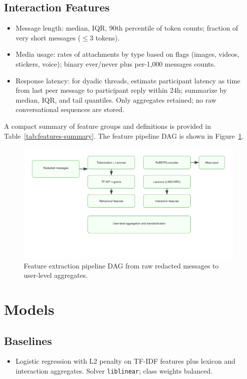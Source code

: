 \subsection{Interaction Features}
\begin{itemize}
  \item Message length: median, IQR, 90th percentile of token counts; fraction of very short messages (\(\leq 3\) tokens).
  \item Media usage: rates of attachments by type based on flags (images, videos, stickers, voice); binary ever/never plus per-1,000 messages counts.
  \item Response latency: for dyadic threads, estimate participant latency as time from last peer message to participant reply within 24h; summarize by median, IQR, and tail quantiles. Only aggregates retained; no raw conversational sequences are stored.
\end{itemize}

A compact summary of feature groups and definitions is provided in Table~\ref{tab:features-summary}. The feature pipeline DAG is shown in Figure~\ref{fig:feature-dag}.

\begin{figure}[t]
  \centering
  \includegraphics[width=0.95\linewidth]{thesis/figures/feature_dag.svg}
  \caption{Feature extraction pipeline DAG from raw redacted messages to user-level aggregates.}
  \label{fig:feature-dag}
\end{figure}

\section{Models}
\label{sec:methods-models}
\subsection{Baselines}
\begin{itemize}
  \item Logistic regression with L2 penalty on TF-IDF features plus lexicon and interaction aggregates. Solver \verb|liblinear|; class weights balanced.
\end{itemize}

